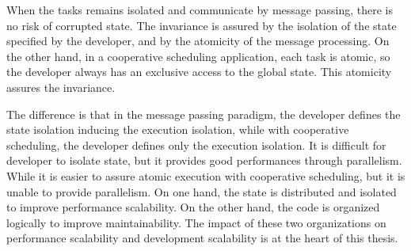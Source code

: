 When the tasks remains isolated and communicate by message passing, there is no risk of corrupted state.
The invariance is assured by the isolation of the state specified by the developer, and by the atomicity of the message processing.
On the other hand, in a cooperative scheduling application, each task is atomic, so the developer always has an exclusive access to the global state.
This atomicity assures the invariance.


The difference is that in the message passing paradigm, the developer defines the state isolation inducing the execution isolation, while with cooperative scheduling, the developer defines only the execution isolation.
It is difficult for developer to isolate state, but it provides good performances through parallelism.
While it is easier to assure atomic execution with cooperative scheduling, but it is unable to provide parallelism.
On one hand, the state is distributed and isolated to improve performance scalability.
On the other hand, the code is organized logically to improve maintainability.
The impact of these two organizations on performance scalability and development scalability is at the heart of this thesis.
